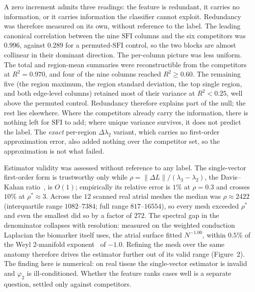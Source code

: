 \documentclass[11pt]{article}
\newcommand{\lam}{\lambda}
\newcommand{\phii}{\varphi}
\newcommand{\rhoval}{\rho}
\newcommand{\SFI}{\ensuremath{\mathrm{SFI}}}
\begin{document}
A zero increment admits three readings: the feature is redundant, it carries no
information, or it carries information the classifier cannot exploit. Redundancy
was therefore measured on its own, without reference to the label. The leading canonical
correlation between the nine \SFI{} columns and the six competitors was $0.996$,
against $0.289$ for a permuted-\SFI{} control, so the two blocks are almost
collinear in their dominant direction. The per-column picture was less uniform.
The total and region-mean summaries were reconstructible from the competitors at
$R^{2}=0.970$, and four of the nine columns reached $R^{2}\geq0.60$. The
remaining five (the region maximum, the region standard deviation, the top
single region, and both edge-level columns) retained most of their variance at
$R^{2}<0.25$, well above the permuted control. Redundancy therefore explains
part of the null; the rest lies elsewhere. Where the competitors already carry
the information, there is nothing left for \SFI{} to add; where unique variance
survives, it does not predict the label. The \emph{exact} per-region
$\Delta\lam_2$ variant, which carries no first-order approximation error, also
added nothing over the competitor set, so the approximation is not what failed.

Estimator validity was assessed without reference to any label. The
single-vector first-order form is trustworthy only while
$\rhoval=\lVert\Delta L\rVert/(\lam_3-\lam_2)$, the Davis--Kahan ratio~\cite{daviskahan1970}, is $O(1)$; empirically its
relative error is $1\%$ at $\rhoval=0.3$ and crosses $10\%$ at
$\rhoval^\ast\approx3$. Across the $12$ scanned real atrial meshes the median was
$\rhoval\approx2422$ (interquartile range $1082$--$7384$; full range
$817$--$16554$), so every mesh exceeded $\rhoval^\ast$ and even the smallest did so
by a factor of $272$. The spectral gap in the denominator collapses with
resolution: measured on the weighted conduction Laplacian the biomarker itself
uses, the atrial surface fitted $N^{-1.00}$, within $0.5\%$ of the Weyl
2-manifold exponent~\cite{weyl1912} of $-1.0$. Refining the mesh over the same anatomy therefore
drives the estimator further out of its valid range (Figure~2). The finding here
is numerical: on real tissue the single-vector estimator is invalid and
$\phii_2$ is ill-conditioned. Whether the feature ranks cases well is a separate
question, settled only against competitors.
\end{document}

